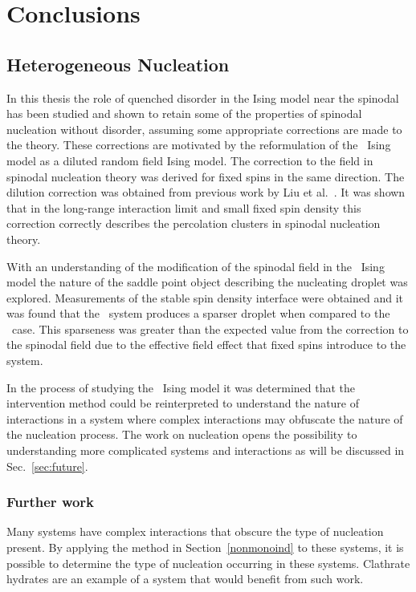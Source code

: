 
\chapter{\label{chp:conclusion}Conclusions}

\section{Heterogeneous Nucleation}

In this thesis the role of quenched disorder in the Ising model near the spinodal has been studied and shown to retain some of the properties of spinodal nucleation without disorder, assuming some appropriate corrections are made to the theory. These corrections are motivated by the reformulation of the \het\ Ising model as a diluted random field Ising model. The correction to the field in spinodal nucleation theory was derived for fixed spins in the same direction. The dilution correction was obtained from previous work by Liu et al.~\cite{kangdilute}. It was shown that in the long-range interaction limit and small fixed spin density this correction correctly describes the percolation clusters in spinodal nucleation theory. 

With an understanding of the modification of the spinodal field in the \het\ Ising model the nature of the saddle point object describing the nucleating droplet was explored. Measurements of the stable spin density interface were obtained and it was found  that the \het\ system produces a sparser droplet when compared to the \homo\ case. This sparseness was greater than the expected value from the correction to the spinodal field  due to the effective field effect that  fixed spins introduce to the system.
 
In the process of studying the \het\ Ising model it was determined that the intervention method could be reinterpreted to understand the nature of interactions in a system where complex interactions may obfuscate the nature of the nucleation process. The work on nucleation opens the possibility to understanding more complicated systems and interactions as will be discussed in Sec.~\ref{sec:future}.

\subsection{\label{sec:future}Further work}

Many systems have complex interactions that obscure the type of nucleation present. By applying the method in Section~\ref{nonmonoind} to these systems, it is possible to determine the type of nucleation occurring in these systems. Clathrate hydrates are an example of a system that would benefit from such work. 
 
